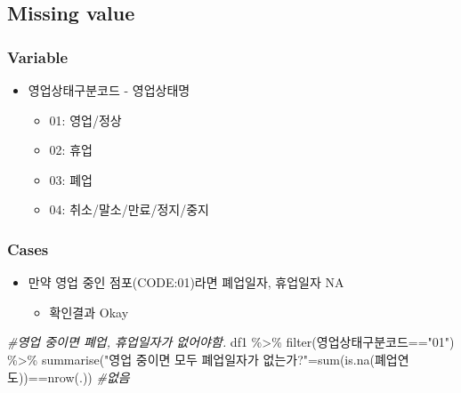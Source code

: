 \documentclass[
]{book}
\newenvironment{Shaded}{\begin{snugshade}}{\end{snugshade}}
\newcommand{\CommentTok}[1]{\textcolor[rgb]{0.56,0.35,0.01}{\textit{#1}}}
\newcommand{\FunctionTok}[1]{\textcolor[rgb]{0.00,0.00,0.00}{#1}}
\newcommand{\NormalTok}[1]{#1}
\newcommand{\OtherTok}[1]{\textcolor[rgb]{0.56,0.35,0.01}{#1}}
\newcommand{\SpecialCharTok}[1]{\textcolor[rgb]{0.00,0.00,0.00}{#1}}
\newcommand{\StringTok}[1]{\textcolor[rgb]{0.31,0.60,0.02}{#1}}
\providecommand{\tightlist}{%
  \setlength{\itemsep}{0pt}\setlength{\parskip}{0pt}}
\begin{document}
\hypertarget{missing-value}{%
\subsection{Missing value}\label{missing-value}}

\hypertarget{variable}{%
\subsubsection{Variable}\label{variable}}

\begin{itemize}
\item
  영업상태구분코드 - 영업상태명

  \begin{itemize}
  \item
    01: 영업/정상
  \item
    02: 휴업
  \item
    03: 폐업
  \item
    04: 취소/말소/만료/정지/중지
  \end{itemize}
\end{itemize}

\hypertarget{cases}{%
\subsubsection{Cases}\label{cases}}

\begin{itemize}
\item
  만약 영업 중인 점포(CODE:01)라면 폐업일자, 휴업일자 NA

  \begin{itemize}
  \tightlist
  \item
    확인결과 Okay
  \end{itemize}
\end{itemize}

\begin{Shaded}
\begin{Highlighting}[]
\CommentTok{\#영업 중이면 폐업, 휴업일자가 없어야함.}
\NormalTok{df1 }\SpecialCharTok{\%\textgreater{}\%} 
  \FunctionTok{filter}\NormalTok{(영업상태구분코드}\SpecialCharTok{==}\StringTok{"01"}\NormalTok{) }\SpecialCharTok{\%\textgreater{}\%}
  \FunctionTok{summarise}\NormalTok{(}\StringTok{"영업 중이면 모두 폐업일자가 없는가?"}\OtherTok{=}\FunctionTok{sum}\NormalTok{(}\FunctionTok{is.na}\NormalTok{(폐업연도))}\SpecialCharTok{==}\FunctionTok{nrow}\NormalTok{(.)) }\CommentTok{\#없음}
\end{Highlighting}
\end{Shaded}
\end{document}
